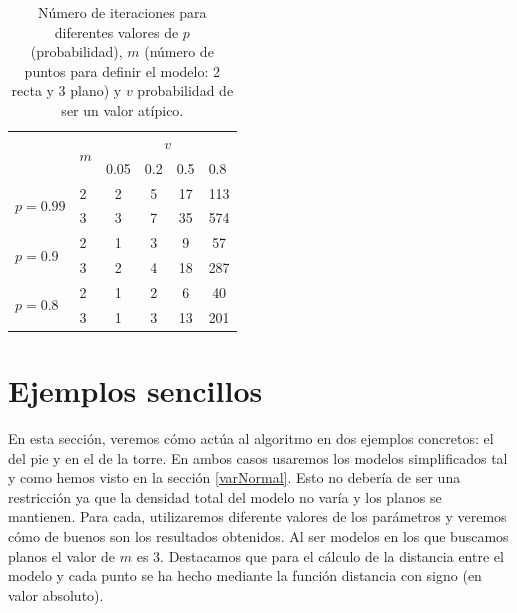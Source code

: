\begin{table}[]
	\centering
	\begin{tabular}{l|l|c|c|c|c|}
		\cline{2-6}
		& \multirow{2}{*}{$ m $} & \multicolumn{4}{c|}{$ v $}                                                                                     \\ \cline{3-6} 
		&                    & \multicolumn{1}{l|}{0.05} & \multicolumn{1}{l|}{0.2} & \multicolumn{1}{l|}{0.5} & \multicolumn{1}{l|}{0.8} \\ \hline
		\multicolumn{1}{|l|}{\multirow{2}{*}{$ p = 0.99 $}} & 2                  & 2                         & 5                        & 17                       & 113                      \\ \cline{2-6} 
		\multicolumn{1}{|l|}{}                          & 3                  & 3                         & 7                        & 35                       & 574                      \\ \hline
		\multicolumn{1}{|l|}{\multirow{2}{*}{$ p = 0.9 $}}  & 2                  & 1                         & 3                        & 9                        & 57                       \\ \cline{2-6} 
		\multicolumn{1}{|l|}{}                          & 3                  & 2                         & 4                        & 18                       & 287                      \\ \hline
		\multicolumn{1}{|l|}{\multirow{2}{*}{$ p = 0.8 $}}  & 2                  & 1                         & 2                        & 6                        & 40                       \\ \cline{2-6} 
		\multicolumn{1}{|l|}{}                          & 3                  & 1                         & 3                        & 13                       & 201                      \\ \hline
	\end{tabular}
\caption{Número de iteraciones para diferentes valores de $ p $ (probabilidad), $ m $ (número de puntos para definir el modelo: 2 recta y 3 plano) y $ v $ probabilidad de ser un valor atípico.}
\label{table:RANSAcvalues}
\end{table}


\section{Ejemplos sencillos}
En esta sección, veremos cómo actúa al algoritmo en dos ejemplos concretos: el del pie y en el de la torre. En ambos casos usaremos los modelos simplificados tal y como hemos visto en la sección \ref{varNormal}. Esto no debería de ser una restricción ya que la densidad total del modelo no varía y los planos se mantienen. Para cada, utilizaremos diferente valores de los parámetros y veremos cómo de buenos son los resultados obtenidos. Al ser modelos en los que buscamos planos el valor de $ m $ es 3. Destacamos que para el cálculo de la distancia entre el modelo y cada punto se ha hecho mediante la función distancia con signo (en valor absoluto).

